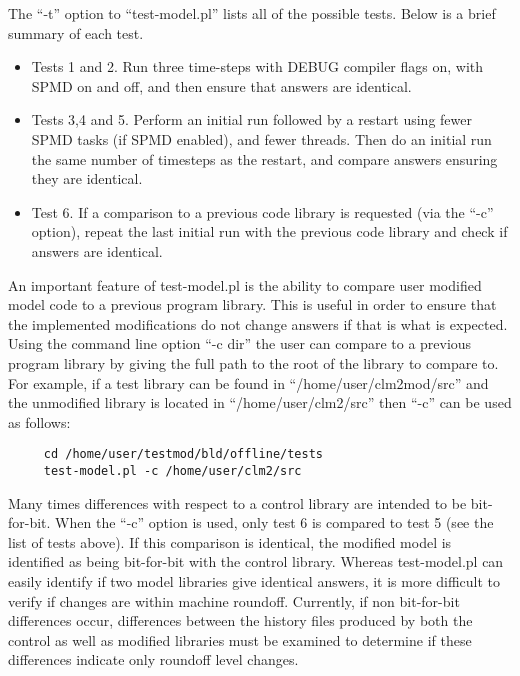 The ``-t'' option to ``test-model.pl'' lists all of the possible
tests.  Below is a brief summary of each test. \newline

\medskip
\begin{itemize}
\item 
Tests 1 and 2. Run three time-steps with DEBUG compiler flags on, with
SPMD on and off, and then ensure that answers are identical.
\item 
Tests 3,4 and 5. Perform an initial run followed by a restart using
fewer SPMD tasks (if SPMD enabled), and fewer threads. Then do an
initial run the same number of timesteps as the restart, and compare
answers ensuring they are identical.

\item 
Test 6. If a comparison to a previous code library is requested (via
the ``-c'' option), repeat the last initial run with the previous code
library and check if answers are identical.
\end{itemize}
\medskip

An important feature of test-model.pl is the ability to compare
user modified model code to a previous program library. This is useful in
order to ensure that the implemented modifications do not change
answers if that is what is expected.  Using the command line option
``-c dir'' the user can compare to a previous program library by giving
the full path to the root of the library to compare to. For example,
if a test library can be found in ``/home/user/clm2mod/src'' and the
unmodified library is located in ``/home/user/clm2/src'' then ``-c''
can be used as follows: \newline

\begin{verbatim}
     cd /home/user/testmod/bld/offline/tests 
     test-model.pl -c /home/user/clm2/src 
\end{verbatim}

Many times differences with respect to a control library are intended
to be bit-for-bit.  When the ``-c'' option is used, only test 6 is
compared to test 5 (see the list of tests above).  If this comparison
is identical, the modified model is identified as being bit-for-bit
with the control library. Whereas test-model.pl can easily identify if
two model libraries give identical answers, it is more difficult to
verify if changes are within machine roundoff. Currently, if non
bit-for-bit differences occur, differences between the history files
produced by both the control as well as modified libraries must be
examined to determine if these differences indicate only roundoff
level changes.
